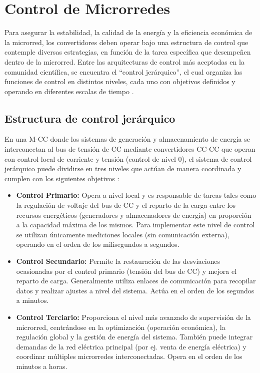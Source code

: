 \section{Control de Microrredes}
\label{sec:teoria_control}
Para asegurar la estabilidad, la calidad de la energía y la eficiencia económica de la microrred, los convertidores deben operar bajo una estructura de control que contemple diversas estrategias, en función de la tarea específica que desempeñen dentro de la microrred. Entre las arquitecturas de control más aceptadas en la comunidad científica, se encuentra el ``control jerárquico'', el cual organiza las funciones de control en distintos niveles, cada uno con objetivos definidos y operando en diferentes escalas de tiempo \cite{Shuai2018}.

\subsection{Estructura de control jerárquico}
En una M-CC donde los sistemas de generación y almacenamiento de energía se interconectan al bus de tensión de CC mediante convertidores CC-CC que operan con control local de corriente y tensión (control de nivel 0), el sistema de control jerárquico puede dividirse en tres niveles que actúan de manera coordinada y cumplen con los siguientes objetivos \cite{Adegboyega2025}:

\begin{itemize}
    \item \textbf{Control Primario:} Opera a nivel local y es responsable de tareas tales como la regulación de voltaje del bus de CC y el reparto de la carga entre los recursos energéticos (generadores y almacenadores de energía) en proporción a la capacidad máxima de los mismos. Para implementar este nivel de control se utilizan únicamente mediciones locales (sin comunicación externa), operando en el orden de los milisegundos a segundos.
    \item \textbf{Control Secundario:} Permite la restauración de las desviaciones ocasionadas por el control primario (tensión del bus de CC) y mejora el reparto de carga. Generalmente utiliza enlaces de comunicación para recopilar datos y realizar ajustes a nivel del sistema. Actúa en el orden de los segundos a minutos.
    \item \textbf{Control Terciario:} Proporciona el nivel más avanzado de supervisión de la microrred, centrándose en la optimización (operación económica), la regulación global y la gestión de energía del sistema. También puede integrar demandas de la red eléctrica principal (por ej. venta de energía eléctrica) y coordinar múltiples microrredes interconectadas. Opera en el orden de los minutos a horas.
\end{itemize}

